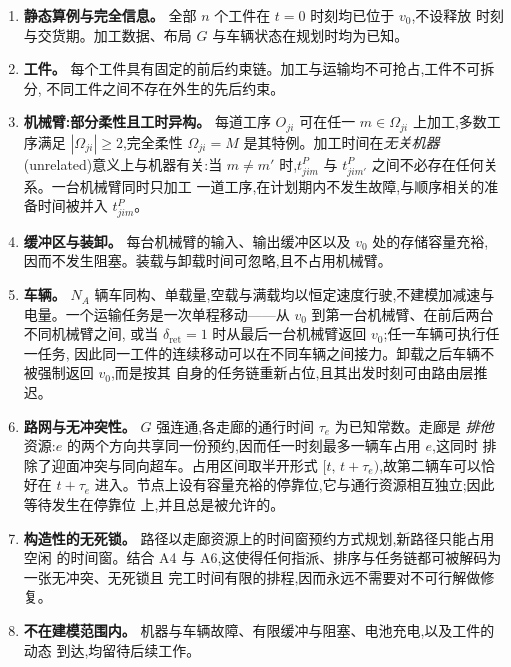 \documentclass[manuscript,screen,review]{acmart}
\begin{document}
\begin{enumerate}[label=\textbf{A\arabic*.},leftmargin=*,topsep=2pt,itemsep=2pt]
\item \textbf{静态算例与完全信息。} 全部 $n$ 个工件在 $t=0$ 时刻均已位于 $v_0$,不设释放
时刻与交货期。加工数据、布局 $G$ 与车辆状态在规划时均为已知。

\item \textbf{工件。} 每个工件具有固定的前后约束链。加工与运输均不可抢占,工件不可拆分,
不同工件之间不存在外生的先后约束。

\item \textbf{机械臂:部分柔性且工时异构。} 每道工序 $O_{ji}$ 可在任一
$m\in\Omega_{ji}$ 上加工,多数工序满足 $|\Omega_{ji}|\ge 2$,完全柔性
$\Omega_{ji}=M$ 是其特例。加工时间在\emph{无关机器}(unrelated)意义上与机器有关:当
$m\neq m'$ 时,$t^P_{jim}$ 与 $t^P_{jim'}$ 之间不必存在任何关系。一台机械臂同时只加工
一道工序,在计划期内不发生故障,与顺序相关的准备时间被并入 $t^P_{jim}$。

\item \textbf{缓冲区与装卸。} 每台机械臂的输入、输出缓冲区以及 $v_0$ 处的存储容量充裕,
因而不发生阻塞。装载与卸载时间可忽略,且不占用机械臂。

\item \textbf{车辆。} $N_A$ 辆车同构、单载量,空载与满载均以恒定速度行驶,不建模加减速与
电量。一个运输任务是一次单程移动——从 $v_0$ 到第一台机械臂、在前后两台不同机械臂之间,
或当 $\delta_{\mathrm{ret}}=1$ 时从最后一台机械臂返回 $v_0$;任一车辆可执行任一任务,
因此同一工件的连续移动可以在不同车辆之间接力。卸载之后车辆不被强制返回 $v_0$,而是按其
自身的任务链重新占位,且其出发时刻可由路由层推迟。

\item \textbf{路网与无冲突性。} $G$ 强连通,各走廊的通行时间 $\tau_e$ 为已知常数。走廊是
\emph{排他}资源:$e$ 的两个方向共享同一份预约,因而任一时刻最多一辆车占用 $e$,这同时
排除了迎面冲突与同向超车。占用区间取半开形式 $[t,\,t+\tau_e)$,故第二辆车可以恰好在
$t+\tau_e$ 进入。节点上设有容量充裕的停靠位,它与通行资源相互独立;因此等待发生在停靠位
上,并且总是被允许的。

\item \textbf{构造性的无死锁。} 路径以走廊资源上的时间窗预约方式规划,新路径只能占用空闲
的时间窗。结合 A4 与 A6,这使得任何指派、排序与任务链都可被解码为一张无冲突、无死锁且
完工时间有限的排程,因而永远不需要对不可行解做修复。

\item \textbf{不在建模范围内。} 机器与车辆故障、有限缓冲与阻塞、电池充电,以及工件的动态
到达,均留待后续工作。
\end{enumerate}
\end{document}
